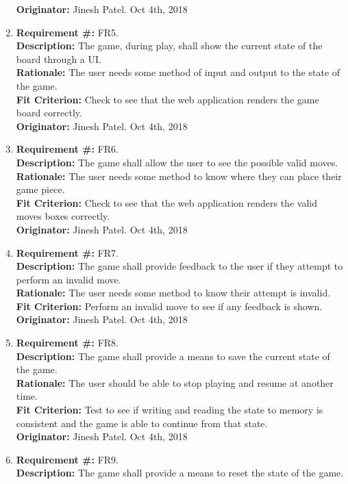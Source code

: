 \documentclass[12pt, titlepage]{article}
\renewcommand{\bf}{\textbf}
\begin{document}
\begin{enumerate}
	      \bf{Originator:} Jinesh Patel. Oct 4th, 2018
	\item \bf{Requirement \#:} FR5.\\
	      \bf{Description:} The game, during play, shall show the current state of the board through a UI.\\
	      \bf{Rationale:} The user needs some method of input and output to the state of the game.\\
	      \bf{Fit Criterion:} Check to see that the web application renders the game board correctly.\\
	      \bf{Originator:} Jinesh Patel. Oct 4th, 2018
	\item \bf{Requirement \#:} FR6.\\
	      \bf{Description:} The game shall allow the user to see the possible valid moves.\\
	      \bf{Rationale:} The user needs some method to know where they can place their game piece.\\
	      \bf{Fit Criterion:} Check to see that the web application renders the valid moves boxes correctly.\\
	      \bf{Originator:} Jinesh Patel. Oct 4th, 2018
	\item \bf{Requirement \#:} FR7.\\
	      \bf{Description:} The game shall provide feedback to the user if they attempt to perform an invalid move.\\
	      \bf{Rationale:} The user needs some method to know their attempt is invalid.\\
	      \bf{Fit Criterion:} Perform an invalid move to see if any feedback is shown.\\
	      \bf{Originator:} Jinesh Patel. Oct 4th, 2018
	\item \bf{Requirement \#:} FR8.\\
	      \bf{Description:} The game shall provide a means to save the current state of the game.\\
	      \bf{Rationale:} The user should be able to stop playing and resume at another time.\\
	      \bf{Fit Criterion:} Test to see if writing and reading the state to memory is consistent and the game is able to continue from that state.\\
	      \bf{Originator:} Jinesh Patel. Oct 4th, 2018
	\item \bf{Requirement \#:} FR9.\\
	      \bf{Description:} The game shall provide a means to reset the state of the game.\\

\end{enumerate}
\end{document}
